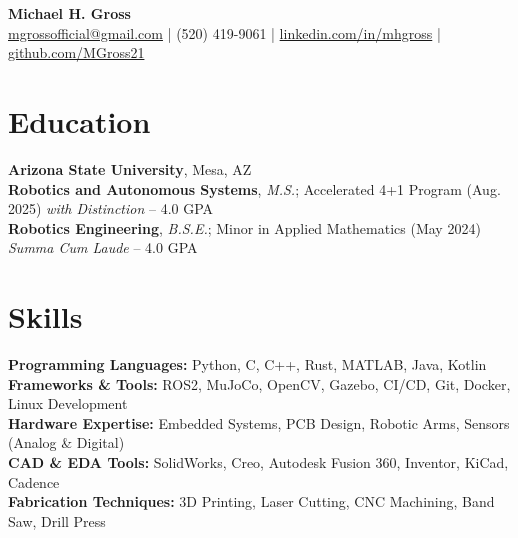 \documentclass[10pt]{article}
\begin{document}

\begin{center}
    {\LARGE \textbf{Michael H. Gross}} \\
    \href{mailto:mgrossofficial@gmail.com}{mgrossofficial@gmail.com} | (520) 419-9061 | 
    \href{https://www.linkedin.com/in/mhgross}{linkedin.com/in/mhgross} | \href{https://github.com/MGross21}{github.com/MGross21}
\end{center}

\section*{Education}
\textbf{Arizona State University}, Mesa, AZ \\
\textbf{Robotics and Autonomous Systems}, \textit{M.S.}; Accelerated 4+1 Program (Aug. 2025) \hfill \textit{with Distinction} -- 4.0 GPA \\
\textbf{Robotics Engineering}, \textit{B.S.E.}; Minor in Applied Mathematics (May 2024) \hfill \textit{Summa Cum Laude} -- 4.0 GPA

\section*{Skills}
\textbf{Programming Languages:} Python, C, C++, Rust, MATLAB, Java, Kotlin \\
\textbf{Frameworks \& Tools:} ROS2, MuJoCo, OpenCV, Gazebo, CI/CD, Git, Docker, Linux Development \\
\textbf{Hardware Expertise:} Embedded Systems, PCB Design, Robotic Arms, Sensors (Analog \& Digital)\\
\textbf{CAD \& EDA Tools:} SolidWorks, Creo, Autodesk Fusion 360, Inventor, KiCad, Cadence \\
\textbf{Fabrication Techniques:} 3D Printing, Laser Cutting, CNC Machining, Band Saw, Drill Press
\end{document}
